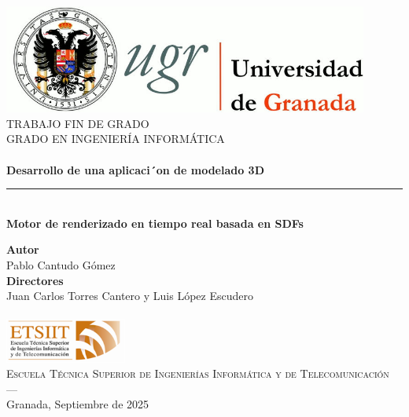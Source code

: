 \begin{titlepage}
 
 
\newlength{\centeroffset}
\setlength{\centeroffset}{-0.5\oddsidemargin}
\addtolength{\centeroffset}{0.5\evensidemargin}
\thispagestyle{empty}

\noindent\hspace*{\centeroffset}\begin{minipage}{\textwidth}

\centering
\includegraphics[width=0.9\textwidth]{imagenes/logo.png}\\[1.4cm]

\textsc{ \Large TRABAJO FIN DE GRADO\\[0.2cm]}
\textsc{ GRADO EN INGENIERÍA INFORMÁTICA}\\[1cm]
% 
{\Huge\bfseries \\ Desarrollo de una aplicaci´on
de modelado 3D}
\noindent\rule[-1ex]{\textwidth}{3pt}\\[3.5ex]
{\large\bfseries Motor de renderizado en tiempo real basada en SDFs}
\end{minipage}

\vspace{2.5cm}
\noindent\hspace*{\centeroffset}\begin{minipage}{\textwidth}
\centering

\textbf{Autor}\\ {Pablo Cantudo Gómez}\\[2.5ex]
\textbf{Directores}\\
{Juan Carlos Torres Cantero y Luis López Escudero\\}\\[2cm]
\includegraphics[width=0.3\textwidth]{imagenes/etsiit_logo.png}\\[0.1cm]
\textsc{Escuela Técnica Superior de Ingenierías Informática y de Telecomunicación}\\
\textsc{---}\\
Granada, Septiembre de 2025
\end{minipage}
\end{titlepage}


